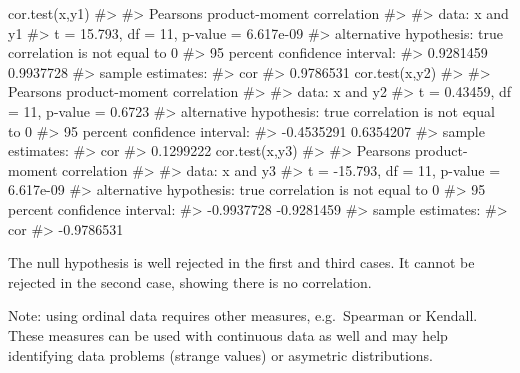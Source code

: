 \documentclass[
  letterpaper,
  DIV=11,
  numbers=noendperiod]{scrreprt}
\newenvironment{Shaded}{\begin{snugshade}}{\end{snugshade}}
\newcommand{\CommentTok}[1]{\textcolor[rgb]{0.37,0.37,0.37}{#1}}
\newcommand{\FunctionTok}[1]{\textcolor[rgb]{0.28,0.35,0.67}{#1}}
\newcommand{\NormalTok}[1]{\textcolor[rgb]{0.00,0.23,0.31}{#1}}
\begin{document}
\begin{Shaded}
\begin{Highlighting}[]
\FunctionTok{cor.test}\NormalTok{(x,y1)}
\CommentTok{\#\textgreater{} }
\CommentTok{\#\textgreater{}  Pearson\textquotesingle{}s product{-}moment correlation}
\CommentTok{\#\textgreater{} }
\CommentTok{\#\textgreater{} data:  x and y1}
\CommentTok{\#\textgreater{} t = 15.793, df = 11, p{-}value = 6.617e{-}09}
\CommentTok{\#\textgreater{} alternative hypothesis: true correlation is not equal to 0}
\CommentTok{\#\textgreater{} 95 percent confidence interval:}
\CommentTok{\#\textgreater{}  0.9281459 0.9937728}
\CommentTok{\#\textgreater{} sample estimates:}
\CommentTok{\#\textgreater{}       cor }
\CommentTok{\#\textgreater{} 0.9786531}
\FunctionTok{cor.test}\NormalTok{(x,y2)}
\CommentTok{\#\textgreater{} }
\CommentTok{\#\textgreater{}  Pearson\textquotesingle{}s product{-}moment correlation}
\CommentTok{\#\textgreater{} }
\CommentTok{\#\textgreater{} data:  x and y2}
\CommentTok{\#\textgreater{} t = 0.43459, df = 11, p{-}value = 0.6723}
\CommentTok{\#\textgreater{} alternative hypothesis: true correlation is not equal to 0}
\CommentTok{\#\textgreater{} 95 percent confidence interval:}
\CommentTok{\#\textgreater{}  {-}0.4535291  0.6354207}
\CommentTok{\#\textgreater{} sample estimates:}
\CommentTok{\#\textgreater{}       cor }
\CommentTok{\#\textgreater{} 0.1299222}
\FunctionTok{cor.test}\NormalTok{(x,y3)}
\CommentTok{\#\textgreater{} }
\CommentTok{\#\textgreater{}  Pearson\textquotesingle{}s product{-}moment correlation}
\CommentTok{\#\textgreater{} }
\CommentTok{\#\textgreater{} data:  x and y3}
\CommentTok{\#\textgreater{} t = {-}15.793, df = 11, p{-}value = 6.617e{-}09}
\CommentTok{\#\textgreater{} alternative hypothesis: true correlation is not equal to 0}
\CommentTok{\#\textgreater{} 95 percent confidence interval:}
\CommentTok{\#\textgreater{}  {-}0.9937728 {-}0.9281459}
\CommentTok{\#\textgreater{} sample estimates:}
\CommentTok{\#\textgreater{}        cor }
\CommentTok{\#\textgreater{} {-}0.9786531}
\end{Highlighting}
\end{Shaded}

The null hypothesis is well rejected in the first and third cases. It
cannot be rejected in the second case, showing there is no correlation.

Note: using ordinal data requires other measures, e.g.~Spearman or
Kendall. These measures can be used with continuous data as well and may
help identifying data problems (strange values) or asymetric
distributions.
\end{document}

